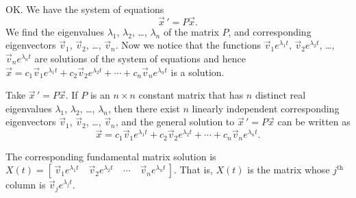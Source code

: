 \documentclass[12pt]{book}
\begin{document}
OK.  We have the system of equations
\begin{equation*}
{\vec{x}\,}' = P\vec{x} .
\end{equation*}
We find the eigenvalues $\lambda_1$, $\lambda_2$, \ldots, $\lambda_n$
of the matrix $P$, and corresponding eigenvectors
$\vec{v}_1$, $\vec{v}_2$, \ldots, $\vec{v}_n$.
Now we notice that the functions
$\vec{v}_1 e^{\lambda_1 t}$, 
$\vec{v}_2 e^{\lambda_2 t}$, \ldots,
$\vec{v}_n e^{\lambda_n t}$ are solutions of the system of equations and hence
$
\vec{x} = c_1 \vec{v}_1 e^{\lambda_1 t} +
c_2 \vec{v}_2 e^{\lambda_2 t} + \cdots +
c_n \vec{v}_n e^{\lambda_n t}
$
is a solution.

\begin{theorem}
Take ${\vec{x}\,}' = P\vec{x}$.  If $P$ is an $n \times n$ constant matrix
that
has $n$ distinct real eigenvalues $\lambda_1$, $\lambda_2$, \ldots, $\lambda_n$,
then there exist $n$ linearly independent corresponding eigenvectors
$\vec{v}_1$, $\vec{v}_2$, \ldots, $\vec{v}_n$, and the general solution to
${\vec{x}\,}' = P\vec{x}$
can be written as
\begin{equation*}
\boxed{~~
\vec{x} = c_1 \vec{v}_1 e^{\lambda_1 t} +
c_2 \vec{v}_2 e^{\lambda_2 t} + \cdots +
c_n \vec{v}_n e^{\lambda_n t} .
~~}
\end{equation*}
\end{theorem}

The corresponding fundamental matrix solution is
$X(t) = [\, \vec{v}_1 e^{\lambda_1 t} \quad \vec{v}_2 e^{\lambda_2 t}
\quad \cdots \quad \vec{v}_n e^{\lambda_n t} \,]$.  That is, $X(t)$
is the matrix whose $j^{\text{th}}$ column is 
$\vec{v}_j e^{\lambda_j t}$.
\end{document}
